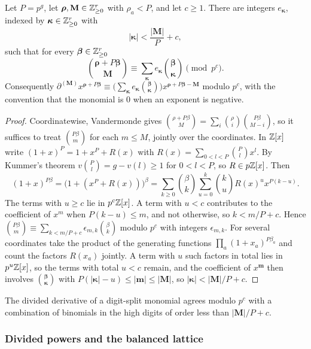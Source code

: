 \begin{proposition}\label{w1:prop:der}
Let $P=p^g$, let $\boldsymbol\rho,\mathbf M\in\mathbb Z_{\ge0}^r$ with $\rho_a<P$, and let $c\ge1$. There are integers $e_{\boldsymbol\kappa}$, indexed by $\boldsymbol\kappa\in\mathbb Z_{\ge0}^r$ with
\[
\lvert\boldsymbol\kappa\rvert<\frac{\lvert\mathbf M\rvert}P+c,
\]
such that for every $\boldsymbol\beta\in\mathbb Z_{\ge0}^r$
\[
\binom{\boldsymbol\rho+P\boldsymbol\beta}{\mathbf M}\equiv\sum_{\boldsymbol\kappa}e_{\boldsymbol\kappa}\binom{\boldsymbol\beta}{\boldsymbol\kappa}\pmod{p^c}.
\]
Consequently $\partial^{(\mathbf M)}x^{\boldsymbol\rho+P\boldsymbol\beta}\equiv\big(\sum_{\boldsymbol\kappa}e_{\boldsymbol\kappa}\binom{\boldsymbol\beta}{\boldsymbol\kappa}\big)x^{\boldsymbol\rho+P\boldsymbol\beta-\mathbf M}$ modulo $p^c$, with the convention that the monomial is $0$ when an exponent is negative.
\end{proposition}

\begin{proof}
Coordinatewise, Vandermonde gives $\binom{\rho+P\beta}M=\sum_{i}\binom\rho i\binom{P\beta}{M-i}$, so it suffices to treat $\binom{P\beta}m$ for each $m\le M$, jointly over the coordinates. In $\mathbb Z[x]$ write $(1+x)^P=1+x^P+R(x)$ with $R(x)=\sum_{0<l<P}\binom Plx^l$. By Kummer's theorem $v\binom Pl=g-v(l)\ge1$ for $0<l<P$, so $R\in p\mathbb Z[x]$. Then
\[
(1+x)^{P\beta}=\big(1+(x^P+R(x))\big)^\beta=\sum_{k\ge0}\binom\beta k\sum_{u=0}^k\binom ku R(x)^ux^{P(k-u)} .
\]
The terms with $u\ge c$ lie in $p^c\mathbb Z[x]$. A term with $u<c$ contributes to the coefficient of $x^m$ when $P(k-u)\le m$, and not otherwise, so $k<m/P+c$. Hence $\binom{P\beta}m\equiv\sum_{k<m/P+c}\epsilon_{m,k}\binom\beta k$ modulo $p^c$ with integers $\epsilon_{m,k}$. For several coordinates take the product of the generating functions $\prod_a(1+x_a)^{P\beta_a}$ and count the factors $R(x_a)$ jointly. A term with $u$ such factors in total lies in $p^u\mathbb Z[x]$, so the terms with total $u<c$ remain, and the coefficient of $x^{\mathbf m}$ then involves $\binom{\boldsymbol\beta}{\boldsymbol\kappa}$ with $P(\lvert\boldsymbol\kappa\rvert-u)\le\lvert\mathbf m\rvert\le\lvert\mathbf M\rvert$, so $\lvert\boldsymbol\kappa\rvert<\lvert\mathbf M\rvert/P+c$.
\end{proof}

The divided derivative of a digit-split monomial agrees modulo $p^c$ with a combination of binomials in the high digits of order less than $\lvert\mathbf M\rvert/P+c$.

\subsubsection{Divided powers and the balanced lattice}

